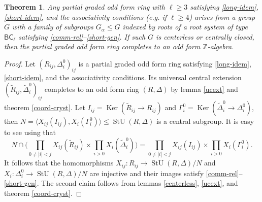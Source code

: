 \documentclass{article}
\newtheorem{theorem}{Theorem}
\theoremstyle{definition}
\DeclareMathOperator\stunit{StU}
\DeclareMathOperator\Ker{Ker}
\begin{document}
\begin{theorem} \label{coord-sphere}
    Any partial graded odd form ring with \(\ell \geq 3\) satisfying \ref{long-idem}, \ref{short-idem}, and the associativity conditions (e.g. if \(\ell \geq 4\)) arises from a group \(G\) with a family of subgroups \(G_\alpha \leq G\) indexed by roots of a root system of type \(\mathsf{BC}_\ell\) satisfying \ref{comm-rel}--\ref{short-gen}. If such \(G\) is centerless or centrally closed, then the partial graded odd form ring completes to an odd form \(\mathbb Z\)-algebra.
\end{theorem}
\begin{proof}
    Let \(
        (R_{ij}, \Delta^0_i)_{ij}
    \) is a partial graded odd form ring satisfying \ref{long-idem}, \ref{short-idem}, and the associativity conditions. Its universal central extension \(
        (
            \widetilde R_{ij},
            \widetilde \Delta^0_i
        )_{ij}
    \) completes to an odd form ring \((R, \Delta)\) by lemma \ref{ucext} and theorem \ref{coord-cryst}. Let \(
        I_{ij} = \Ker(\widetilde R_{ij} \to R_{ij})
    \) and \(
        \Gamma^0_i = \Ker(
            \widetilde \Delta^0_i \to \Delta^0_i
        )
    \), then \(
        N = \langle
            X_{ij}(I_{ij}),
            X_i(\Gamma^0_i)
        \rangle \leq \stunit(R, \Delta)
    \) is a central subgroup. It is easy to see using \cite[lemma 11]{thesis} that \[
        N \cap \bigl(
            \prod_{0 \neq |i| < j}
                X_{ij}(\widetilde R_{ij})
            \times \prod_{i > 0}
                X_i(\widetilde \Delta^0_i)
        \bigr)
        =
        \prod_{0 \neq |i| < j} X_{ij}(I_{ij})
        \times \prod_{i > 0} X_i(\Gamma^0_i).
    \] It follows that the homomorphisms \(
        X_{ij}
        \colon R_{ij}
        \to \stunit(R, \Delta) / N
    \) and \(
        X_i
        \colon \Delta^0_i
        \to \stunit(R, \Delta) / N
    \) are injective and their images satisfy \ref{comm-rel}--\ref{short-gen}. The second claim follows from lemmas \ref{centerless}, \ref{ucext}, and theorem \ref{coord-cryst}.
\end{proof}





\end{document}
